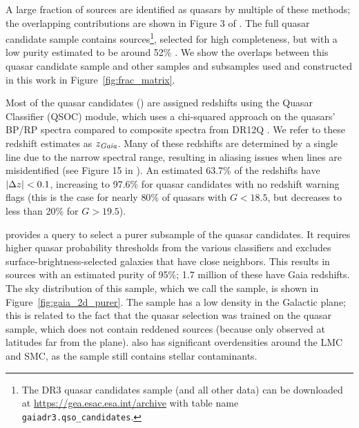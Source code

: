 A large fraction of sources are identified as quasars by multiple of these methods; the overlapping contributions are shown in Figure 3 of \cite{gaia_collaboration_gaia_2023}.
The full quasar candidate sample contains  sources\footnote{The \Gaia DR3 quasar candidates sample (and all other \Gaia data) can be downloaded at \url{https://gea.esac.esa.int/archive} with table name \texttt{gaiadr3.qso\_candidates}.}, selected for high completeness, but with a low purity estimated to be around 52\% \citep{gaia_collaboration_gaia_2023}.
We show the overlaps between this \Gaia quasar candidate sample and other samples and subsamples used and constructed in this work in Figure~\ref{fig:frac_matrix}.

Most of the quasar candidates () are assigned redshifts using the Quasar Classifier (QSOC) module, which uses a chi-squared approach on the quasars' BP/RP spectra compared to composite spectra from \SDSS DR12Q \citep{delchambre_gaia_2023}.
We refer to these \Gaia redshift estimates as $z_\mathrm{\emph{Gaia}}$.
Many of these redshifts are determined by a single line due to the narrow spectral range, resulting in aliasing issues when lines are misidentified (see Figure 15 in \citealt{delchambre_gaia_2023}).
An estimated 63.7\% of the redshifts have $|\Delta z| < 0.1$, increasing to 97.6\% for quasar candidates with no redshift warning flags (this is the case for nearly $80\%$ of quasars with $G<18.5$, but decreases to less than 20\% for $G>19.5$).

\cite{gaia_collaboration_gaia_2023} provides a query to select a purer subsample of the quasar candidates.
It requires higher quasar probability thresholds from the various classifiers and excludes surface-brightness-selected galaxies that have close neighbors.
This results in  sources with an estimated purity of 95\%; 1.7 million of these have Gaia redshifts. 
The sky distribution of this sample, which we call the \Gaiapurer sample, is shown in Figure~\ref{fig:gaia_2d_purer}.
The \Gaiapurer sample has a low density in the Galactic plane; this is related to the fact that the \Gaia quasar selection was trained on the \SDSS quasar sample, which does not contain reddened sources (because \SDSS only observed at latitudes far from the plane).
\Gaiapurer also has significant overdensities around the LMC and SMC, as the sample still contains stellar contaminants.

